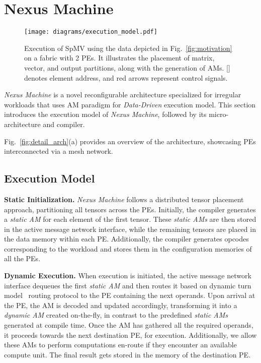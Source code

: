 \section{Nexus Machine}
\begin{figure}[h!]
	\scriptsize
	\centering
    \texttt{[image: diagrams/execution\_model.pdf]}
    \vspace{-0.65cm}
    \caption{Execution of SpMV using the data depicted in Fig.~\ref{fig:motivation} on a fabric with 2 PEs. It illustrates the placement of matrix, vector, and output partitions, along with the generation of AMs. [] denotes element address, and {\color{red}red} arrows represent control signals.}
    \label{fig:exec_model}
\end{figure}
\textit{Nexus Machine} is a novel reconfigurable architecture specialized for irregular workloads that uses AM paradigm for \textit{Data-Driven} execution model.
This section introduces the execution model of \textit{Nexus Machine}, followed by its micro-architecture and compiler.

Fig.~\ref{fig:detail_arch}(a) provides an overview of the architecture, showcasing PEs interconnected via a mesh network.
\subsection{Execution Model}
\textbf{Static Initialization.}
\textit{Nexus Machine} follows a distributed tensor placement approach, partitioning all tensors across the PEs.
Initially, the compiler generates a \textit{static AM} for each element of the first tensor.
These \textit{static AMs} are then stored in the active message network interface, while the remaining tensors are placed in the data memory within each PE. 
Additionally, the compiler generates opcodes corresponding to the workload and stores them in the configuration memories of all the PEs.

\textbf{Dynamic Execution.}
When execution is initiated, the active message network interface dequeues the first \textit{static AM} and then routes it based on dynamic turn model~\cite{noc_peh} routing protocol to the PE containing the next operands.
Upon arrival at the PE, the AM is decoded and updated accordingly, transforming it into a \textit{dynamic AM} created on-the-fly, in contrast to the predefined \textit{static AMs} generated at compile time.
Once the AM has gathered all the required operands, it proceeds towards the next destination PE, for execution. 
Additionally, we allow these AMs to perform computations en-route if they encounter an available compute unit.
The final result gets stored in the memory of the destination PE.

